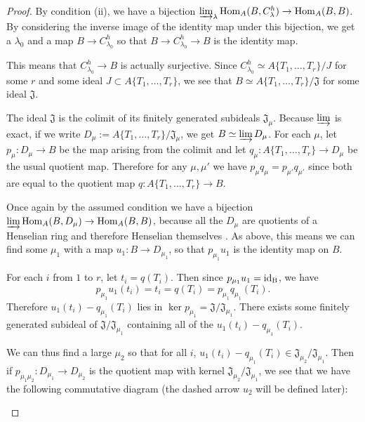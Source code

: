 \documentclass[12pt]{article}
\newcommand{\J}{\mathfrak{J}}
\newcommand{\Hom}{{\rm Hom}}
\newcommand{\colim}{\varinjlim}
\newcommand{\spcite}[2]{\cite[\href{https://stacks.math.columbia.edu/tag/#1}{{#2} {#1}}]{stackp}}
\theoremstyle{definition}
\numberwithin{equation}{subsection}
\begin{document}
\begin{proof}
By condition (ii), we have a bijection $\colim_\lambda \Hom_A(B, C_\lambda^h) \to \Hom_A(B,B)$. By considering the inverse image of the identity map under this bijection, we get a $\lambda_0$ and a map $B \to C_{\lambda_0}^h$ so that $B \to C_{\lambda_0}^h \to B$ is the identity map.

This means that $C_{\lambda_0}^h \to B$ is actually surjective. Since $C_{\lambda_0}^h \simeq A\{T_1,\dots,T_r\}/J$ for some $r$ and some ideal $J \subset A\{T_1,\dots,T_r\}$, we see that $B \simeq A\{T_1,\dots,T_r\}/\J$ for some ideal $\J$.

The ideal $\J$ is the colimit of its finitely generated subideals $\J_\mu$. Because $\colim$ is exact, if we write $D_\mu := A\{T_1,\dots,T_r\}/\J_\mu$, we get $B \simeq \colim D_\mu$. For each $\mu$, let $p_{\mu}: D_\mu \to B$ be the map arising from the colimit and let $q_{\mu}: A\{T_1,\dots,T_r\} \to D_\mu$ be the usual quotient map. Therefore for any $\mu,\mu'$ we have $p_{\mu}q_{\mu}=p_{\mu'}q_{\mu'}$ since both are equal to the quotient map $q:A\{T_1,\dots,T_r\} \to B$.

Once again by the assumed condition we have a bijection $\colim \Hom_A(B,D_\mu) \to \Hom_A(B,B)$, because all the $D_\mu$ are quotients of a Henselian ring and therefore Henselian themselves \spcite{09XK}{Lemma}. As above, this means we can find some $\mu_1$ with a map $u_1: B \to D_{\mu_1}$, so that $p_{\mu_1}u_1$ is the identity map on $B$. 


For each $i$ from $1$ to $r$, let $t_i=q(T_i)$. Then since $p_{\mu_1}u_1=\rm{id}_B$, we have $$p_{\mu_1}u_1(t_i)=t_i=q(T_i)=p_{\mu_1}q_{\mu_1}(T_i).$$ Therefore $u_1(t_i)-q_{\mu_1}(T_i)$ lies in $\ker p_{\mu_1} = \J/\J_{\mu_1}$. There exists some finitely generated subideal of $\J/\J_{\mu_1}$ containing all of the $u_1(t_i)-q_{\mu_1}(T_i)$. 

We can thus find a large $\mu_2$ so that for all $i$, $u_1(t_i)-q_{\mu_1}(T_i) \in \J_{\mu_2}/\J_{\mu_1}$. Then if $p_{\mu_1\mu_2}: D_{\mu_1} \to D_{\mu_2}$ is the quotient map with kernel $\J_{\mu_2}/\J_{\mu_1}$, we see that we have the following commutative diagram (the dashed arrow $u_2$ will be defined later):


\begin{center}
\end{center} \vspace{-.4in}



\end{proof}
\end{document}

